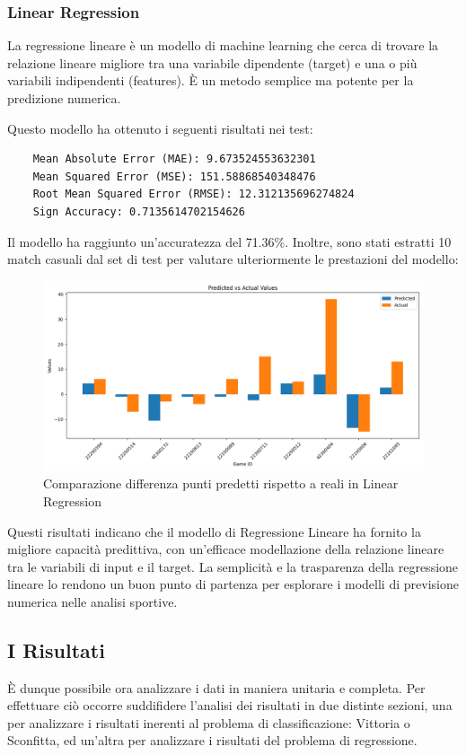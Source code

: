 \subsubsection{Linear Regression}

La regressione lineare è un modello di machine learning che cerca di trovare la relazione lineare migliore tra una variabile dipendente (target) e una o più variabili indipendenti (features). È un metodo semplice ma potente per la predizione numerica.

Questo modello ha ottenuto i seguenti risultati nei test:

\begin{lstlisting}
    Mean Absolute Error (MAE): 9.673524553632301
    Mean Squared Error (MSE): 151.58868540348476
    Root Mean Squared Error (RMSE): 12.312135696274824
    Sign Accuracy: 0.7135614702154626
\end{lstlisting}

Il modello ha raggiunto un'accuratezza del 71.36\%. Inoltre, sono stati estratti 10 match casuali dal set di test per valutare ulteriormente le prestazioni del modello:

\begin{figure}[H]
    \centering
    \includegraphics[width=0.7\linewidth]{img/linear_regression_istogramma.png}
    \caption{Comparazione differenza punti predetti rispetto a reali in Linear Regression}
    \label{fig:enter-label}
\end{figure}

Questi risultati indicano che il modello di Regressione Lineare ha fornito la migliore capacità predittiva, con un'efficace modellazione della relazione lineare tra le variabili di input e il target. La semplicità e la trasparenza della regressione lineare lo rendono un buon punto di partenza per esplorare i modelli di previsione numerica nelle analisi sportive.


\subsection{I Risultati}
È dunque possibile ora analizzare i dati in maniera unitaria e completa. Per effettuare ciò occorre suddifidere l'analisi dei risultati in due distinte sezioni, una per analizzare i risultati inerenti al problema di classificazione: Vittoria o Sconfitta, ed un'altra per analizzare i risultati del problema di regressione.

